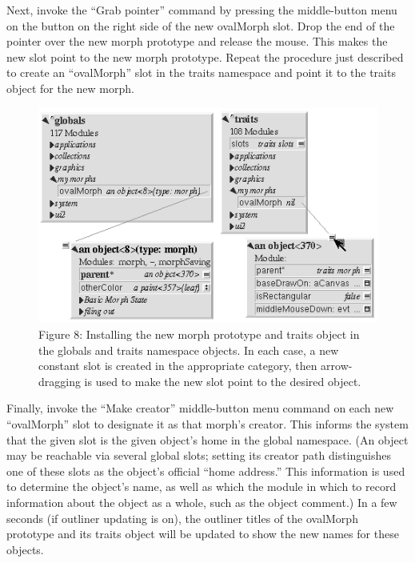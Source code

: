 \documentclass[letterpaper,10pt,english]{sphinxmanual}
\begin{document}
Next, invoke the ``Grab pointer'' command by pressing the middle-button menu on the button on the right side of the new ovalMorph slot. Drop the end of the pointer over the new morph prototype and release the mouse. This makes the new slot point to the new morph prototype. Repeat the procedure just described to create an ``ovalMorph'' slot in the traits namespace and point it to the traits object for the new morph.
\begin{figure}[htbp]\begin{flushleft}
\capstart

\includegraphics{Figure8.png}
\caption{Figure 8: Installing the new morph prototype and traits object in the globals and traits namespace objects. In each case, a new constant slot is created in the appropriate category, then arrow-dragging is used to make the new slot point to the desired object.}\end{flushleft}\end{figure}

Finally, invoke the ``Make creator'' middle-button menu command on each new ``ovalMorph'' slot to designate it as that morph's creator. This informs the system that the given slot is the given object's home in the global namespace. (An object may be reachable via several global slots; setting its creator path distinguishes one of these slots as the object's official ``home address.'' This information is used to determine the object's name, as well as which the module in which to record information about the object as a whole, such as the object comment.) In a few seconds (if outliner updating is on), the outliner titles of the ovalMorph prototype and its traits object will be updated to show the new names for these objects.
\end{document}
